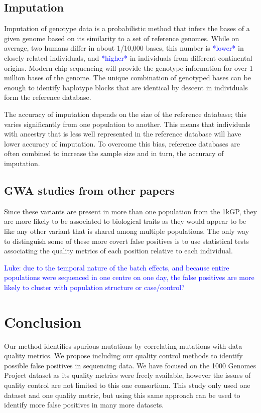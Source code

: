 \documentclass[9pt,lineno]{elife}
\newcommand{\luke}[1]{\textcolor{blue}{Luke: #1}}
\newcommand{\todo}[1]{\textcolor{blue}{*#1*}}
\begin{document}
\subsection{Imputation}
Imputation of genotype data is a probabilistic method that infers the bases of a given genome based on its similarity to a set of reference genomes.
While on average, two humans differ in about 1/10,000 bases, this number is \todo{lower} in closely related individuals, and \todo{higher} in individuals from different continental origins.
Modern chip sequencing will provide the genotype information for over 1 million bases of the genome.
The unique combination of genotyped bases can be enough to identify haplotype blocks that are identical by descent in individuals form the reference database.


The accuracy of imputation depends on the size of the reference database; this varies significantly from one population to another.
This means that individuals with ancestry that is less well represented in the reference database will have lower accuracy of imputation.
To overcome this bias, reference databases are often combined to increase the sample size and in turn, the accuracy of imputation.

\subsection{GWA studies from other papers}
Since these variants are present in more than one population from the 1kGP, they are more likely to be associated to biological traits as they would appear to be like any other variant that is shared among multiple populations. 
The only way to distinguish some of these more covert false positives is to use statistical tests associating the quality metrics of each position relative to each individual. 

\luke{due to the temporal nature of the batch effects, and because entire populations were sequenced in one centre on one day, the false positives are more likely to cluster with population structure or case/control?}

			\section{Conclusion}
Our method identifies spurious mutations by correlating mutations with data quality metrics. 
We propose including our quality control methods to identify possible false positives in sequencing data. 
We have focused on the 1000 Genomes Project dataset as its quality metrics were freely available, however the issues of quality control are not limited to this one consortium. 
This study only used one dataset and one quality metric, but using this same approach can be used to identify more false positives in many more datasets. 
\end{document}
